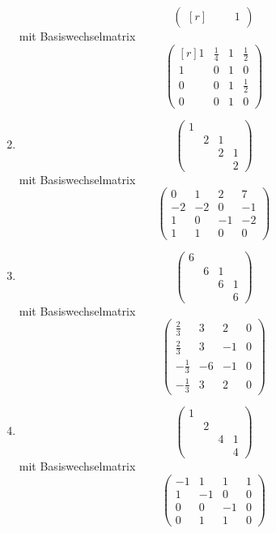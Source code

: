 \begin{solution}
\begin{enumerate}
\[\begin{pmatrix*}[r]
              &     &   & 1
        \end{pmatrix*}
      \]
      mit Basiswechselmatrix
      \[
        \begin{pmatrix*}[r]
          1 & \frac{1}{4} & 1 & \frac{1}{2} \\
          1 & 0           & 1 & 0           \\
          0 & 0           & 1 & \frac{1}{2} \\
          0 & 0           & 1 & 0
        \end{pmatrix*}
      \]
    \item
      \[
        \begin{pmatrix}
          1 &   &   &   \\
            & 2 & 1 &   \\
            &   & 2 & 1 \\
            &   &   & 2
        \end{pmatrix}
      \]
      mit Basiswechselmatrix
      \[
        \begin{pmatrix}
           0  &  1  &  2  &  7  \\
          -2  & -2  &  0  & -1  \\
           1  &  0  & -1  & -2  \\
           1  &  1  &  0  &  0
        \end{pmatrix}
      \]
    \item
      \[
        \begin{pmatrix}
          6 &   &   &   \\
            & 6 & 1 &   \\
            &   & 6 & 1 \\
            &   &   & 6
        \end{pmatrix}
      \]
      mit Basiswechselmatrix
      \[
        \begin{pmatrix}
           \frac{2}{3}  &  3  &  2  & 0 \\
           \frac{2}{3}  &  3  & -1  & 0 \\
          -\frac{1}{3}  & -6  & -1  & 0 \\
          -\frac{1}{3}  &  3  &  2  & 0
        \end{pmatrix}
      \]
    \item
      \[
        \begin{pmatrix}
          1 &   &   &   \\
            & 2 &   &   \\
            &   & 4 & 1 \\
            &   &   & 4
        \end{pmatrix}
      \]
      mit Basiswechselmatrix
      \[
        \begin{pmatrix}
          -1  &  1  &  1  & 1 \\
           1  & -1  &  0  & 0 \\
           0  &  0  & -1  & 0 \\
           0  &  1  &  1  & 0
        \end{pmatrix}
      \]
  \end{enumerate}
\end{solution}



